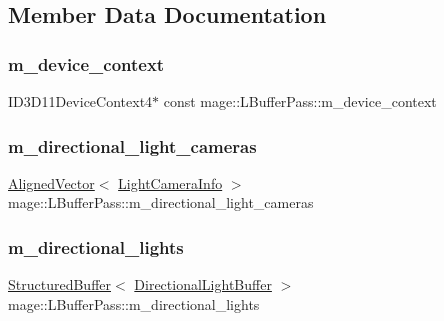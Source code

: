 \subsection{Member Data Documentation}
\hypertarget{classmage_1_1_l_buffer_pass_aa3f3eb2e2e4303398553eb9f07344845}{}\label{classmage_1_1_l_buffer_pass_aa3f3eb2e2e4303398553eb9f07344845} 
\subsubsection{\texorpdfstring{m\+\_\+device\+\_\+context}{m\_device\_context}}
{\footnotesize\ttfamily I\+D3\+D11\+Device\+Context4$\ast$ const mage\+::\+L\+Buffer\+Pass\+::m\+\_\+device\+\_\+context\hspace{0.3cm}{\ttfamily [private]}}

\hypertarget{classmage_1_1_l_buffer_pass_ab6eead232cc2886b1d29e9f6cc45b16d}{}\label{classmage_1_1_l_buffer_pass_ab6eead232cc2886b1d29e9f6cc45b16d} 
\subsubsection{\texorpdfstring{m\+\_\+directional\+\_\+light\+\_\+cameras}{m\_directional\_light\_cameras}}
{\footnotesize\ttfamily \hyperlink{namespacemage_a8664bfb5ce2179fc64eae9f82c8a5ba8}{Aligned\+Vector}$<$ \hyperlink{structmage_1_1_l_buffer_pass_1_1_light_camera_info}{Light\+Camera\+Info} $>$ mage\+::\+L\+Buffer\+Pass\+::m\+\_\+directional\+\_\+light\+\_\+cameras\hspace{0.3cm}{\ttfamily [private]}}

\hypertarget{classmage_1_1_l_buffer_pass_a90327556a34fe3a56e6980accead0c44}{}\label{classmage_1_1_l_buffer_pass_a90327556a34fe3a56e6980accead0c44} 
\subsubsection{\texorpdfstring{m\+\_\+directional\+\_\+lights}{m\_directional\_lights}}
{\footnotesize\ttfamily \hyperlink{classmage_1_1_structured_buffer}{Structured\+Buffer}$<$ \hyperlink{structmage_1_1_directional_light_buffer}{Directional\+Light\+Buffer} $>$ mage\+::\+L\+Buffer\+Pass\+::m\+\_\+directional\+\_\+lights\hspace{0.3cm}{\ttfamily [private]}}

